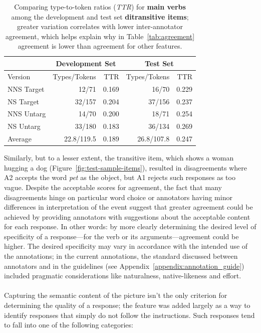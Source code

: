\begin{table}[htb!]
\begin{center}
\begin{tabular}{|l||r|r||r|r|}
\hline
 & \multicolumn{2}{|c||}{Development Set} & \multicolumn{2}{|c|}{Test Set} \\
\hline
Version	& Types/Tokens & TTR & Types/Tokens & TTR \\
\hline
\hline
NNS Target & 12/71 & 0.169 & 16/70 & 0.229 \\
\hline
NS Target & 32/157 & 0.204 & 37/156 & 0.237 \\
\hline
NNS Untarg & 14/70 & 0.200 & 18/71 & 0.254 \\
\hline
NS Untarg & 33/180 & 0.183 & 36/134 & 0.269 \\
\hline
\hline
Average & 22.8/119.5 & 0.189 & 26.8/107.8 & 0.247 \\
\hline
\end{tabular}
\caption{\label{tab:pref-dev-vs-test} Comparing type-to-token ratios (\textit{TTR}) for \textbf{main verbs} among the development and test set \textbf{ditransitive items}; greater variation correlates with lower  inter-annotator agreement, which helps explain why in Table~\ref{tab:agreement}  agreement is lower than agreement for other features.}
\end{center}
\end{table}

Similarly, but to a lesser extent, the transitive item, which shows a woman hugging a dog (Figure~\ref{fig:test-sample-items}), resulted in disagreements where A2 accepts the word \textit{pet} as the object, but A1 rejects such responses as too vague. Despite the acceptable scores for  agreement, the fact that many disagreements hinge on particular word choice or annotators having minor differences in interpretation of the event suggest that greater agreement could be achieved by providing annotators with suggestions about the acceptable content for each response. In other words: by more clearly determining the desired level of specificity of a response---for the verb or its arguments---agreement could be higher. The desired specificity may vary in accordance with the intended use of the annotations; in the current annotations, the standard discussed between annotators and in the guidelines (see Appendix~\ref{appendix:annotation_guide}) included pragmatic considerations like naturalness, native-likeness and effort.

\paragraph{} Capturing the semantic content of the picture isn't the only criterion for determining the quality of a response; the  feature was added largely as a way to identify responses that simply do not follow the instructions. Such responses tend to fall into one of the following categories:

